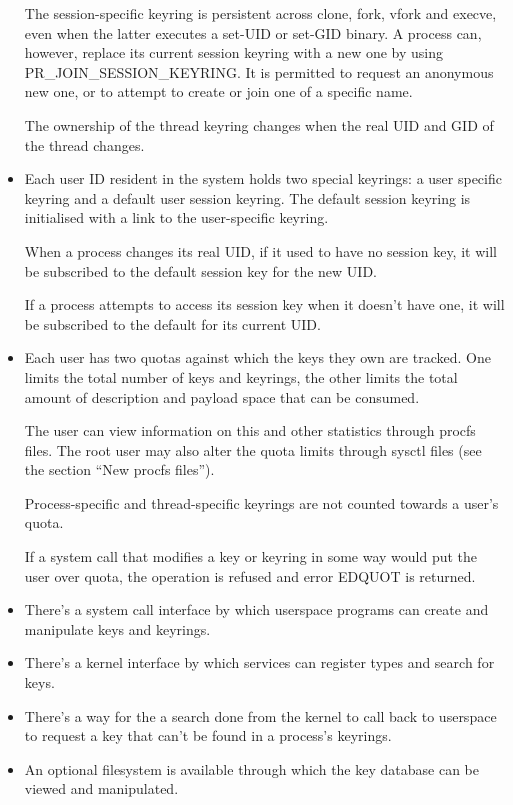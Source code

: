 \documentclass[a4paper,8pt,english]{sphinxmanual}
\begin{document}
\begin{itemize}
The session-specific keyring is persistent across clone, fork, vfork and
execve, even when the latter executes a set-UID or set-GID binary. A
process can, however, replace its current session keyring with a new one
by using PR\_JOIN\_SESSION\_KEYRING. It is permitted to request an anonymous
new one, or to attempt to create or join one of a specific name.

The ownership of the thread keyring changes when the real UID and GID of
the thread changes.

\item {} 
Each user ID resident in the system holds two special keyrings: a user
specific keyring and a default user session keyring. The default session
keyring is initialised with a link to the user-specific keyring.

When a process changes its real UID, if it used to have no session key, it
will be subscribed to the default session key for the new UID.

If a process attempts to access its session key when it doesn't have one,
it will be subscribed to the default for its current UID.

\item {} 
Each user has two quotas against which the keys they own are tracked. One
limits the total number of keys and keyrings, the other limits the total
amount of description and payload space that can be consumed.

The user can view information on this and other statistics through procfs
files.  The root user may also alter the quota limits through sysctl files
(see the section ``New procfs files'').

Process-specific and thread-specific keyrings are not counted towards a
user's quota.

If a system call that modifies a key or keyring in some way would put the
user over quota, the operation is refused and error EDQUOT is returned.

\item {} 
There's a system call interface by which userspace programs can create and
manipulate keys and keyrings.

\item {} 
There's a kernel interface by which services can register types and search
for keys.

\item {} 
There's a way for the a search done from the kernel to call back to
userspace to request a key that can't be found in a process's keyrings.

\item {} 
An optional filesystem is available through which the key database can be
viewed and manipulated.

\end{itemize}
\end{document}
